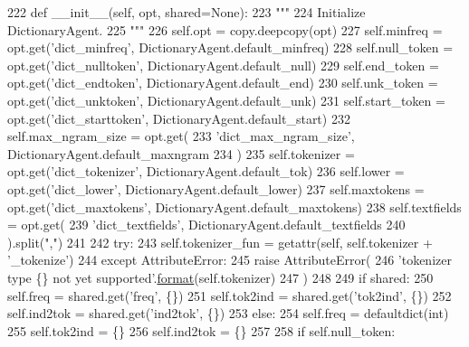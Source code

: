 \begin{DoxyCode}
222     \textcolor{keyword}{def }\_\_init\_\_(self, opt, shared=None):
223         \textcolor{stringliteral}{"""}
224 \textcolor{stringliteral}{        Initialize DictionaryAgent.}
225 \textcolor{stringliteral}{        """}
226         self.opt = copy.deepcopy(opt)
227         self.minfreq = opt.get(\textcolor{stringliteral}{'dict\_minfreq'}, DictionaryAgent.default\_minfreq)
228         self.null\_token = opt.get(\textcolor{stringliteral}{'dict\_nulltoken'}, DictionaryAgent.default\_null)
229         self.end\_token = opt.get(\textcolor{stringliteral}{'dict\_endtoken'}, DictionaryAgent.default\_end)
230         self.unk\_token = opt.get(\textcolor{stringliteral}{'dict\_unktoken'}, DictionaryAgent.default\_unk)
231         self.start\_token = opt.get(\textcolor{stringliteral}{'dict\_starttoken'}, DictionaryAgent.default\_start)
232         self.max\_ngram\_size = opt.get(
233             \textcolor{stringliteral}{'dict\_max\_ngram\_size'}, DictionaryAgent.default\_maxngram
234         )
235         self.tokenizer = opt.get(\textcolor{stringliteral}{'dict\_tokenizer'}, DictionaryAgent.default\_tok)
236         self.lower = opt.get(\textcolor{stringliteral}{'dict\_lower'}, DictionaryAgent.default\_lower)
237         self.maxtokens = opt.get(\textcolor{stringliteral}{'dict\_maxtokens'}, DictionaryAgent.default\_maxtokens)
238         self.textfields = opt.get(
239             \textcolor{stringliteral}{'dict\_textfields'}, DictionaryAgent.default\_textfields
240         ).split(\textcolor{stringliteral}{","})
241 
242         \textcolor{keywordflow}{try}:
243             self.tokenizer\_fun = getattr(self, self.tokenizer + \textcolor{stringliteral}{'\_tokenize'})
244         \textcolor{keywordflow}{except} AttributeError:
245             \textcolor{keywordflow}{raise} AttributeError(
246                 \textcolor{stringliteral}{'tokenizer type \{\} not yet supported'}.\hyperlink{namespaceparlai_1_1chat__service_1_1services_1_1messenger_1_1shared__utils_a32e2e2022b824fbaf80c747160b52a76}{format}(self.tokenizer)
247             )
248 
249         \textcolor{keywordflow}{if} shared:
250             self.freq = shared.get(\textcolor{stringliteral}{'freq'}, \{\})
251             self.tok2ind = shared.get(\textcolor{stringliteral}{'tok2ind'}, \{\})
252             self.ind2tok = shared.get(\textcolor{stringliteral}{'ind2tok'}, \{\})
253         \textcolor{keywordflow}{else}:
254             self.freq = defaultdict(int)
255             self.tok2ind = \{\}
256             self.ind2tok = \{\}
257 
258             \textcolor{keywordflow}{if} self.null\_token:

\end{DoxyCode}
